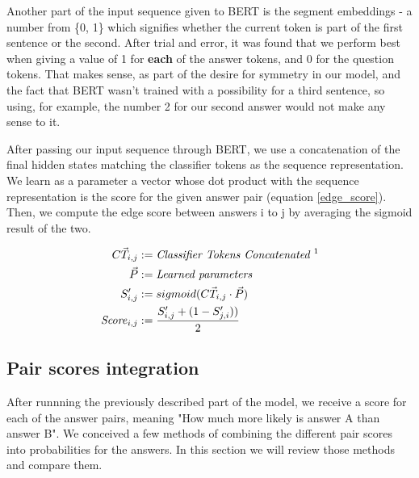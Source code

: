 \documentclass{article}
\begin{document}

Another part of the input sequence given to BERT is the segment embeddings - a number from \{0, 1\} which signifies whether the current token is part of the first sentence or the second. After trial and error, it was found that we perform best when giving a value of 1 for \textbf{each} of the answer tokens, and 0 for the question tokens. That makes sense, as part of the desire for symmetry in our model, and the fact that BERT wasn't trained with a possibility for a third sentence, so using, for example, the number 2 for our second answer would not make any sense to it.

After passing our input sequence through BERT, we use a concatenation of the final hidden states matching the classifier tokens as the sequence representation. We learn as a parameter a vector whose dot product with the sequence representation is the score for the given answer pair (equation \ref{edge_score}). Then, we compute the edge score between answers i to j by averaging the sigmoid result of the two. 



\begin{equation}
  \begin{aligned}
      \vec{CT_{i,j}} &:= \text{\textit{Classifier Tokens Concatenated \footnotemark}}\\ 
    \vec{P} &:= \text{\textit{Learned parameters}}\\
    S'_{i,j} &:= sigmoid(\vec{CT_{i,j}} \cdot \vec{P})\\
    \text{\textit{Score}}_{i,j} &:= \frac{S'_{i,j} + (1-S'_{j,i}))}{2}
  \end{aligned}
  \label{edge_score}
\end{equation}


\subsection{Pair scores integration}

After runnning the previously described part of the model, we receive a score for each of the answer pairs, meaning "How much more likely is answer A than answer B". We conceived a few methods of combining the different pair scores into probabilities for the answers. In this section we will review those methods and compare them.
\end{document}
